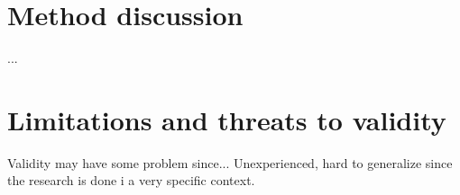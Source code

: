 \section{Method discussion}

...

\section{Limitations and threats to validity}

Validity may have some problem since...
Unexperienced, hard to generalize since the research is done i a very specific context.
